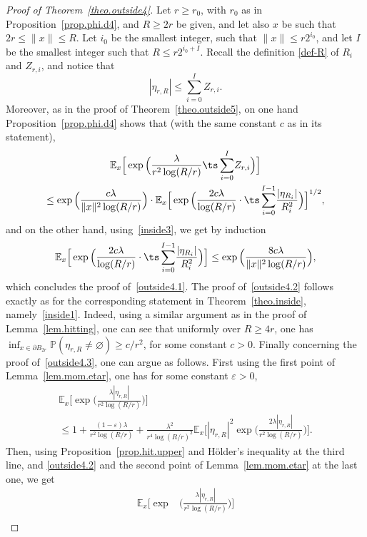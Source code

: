 \begin{proof}[Proof of Theorem~\ref{theo.outside4}]
Let $r\ge r_0$, with $r_0$ as in Proposition~\ref{prop.phi.d4}, and $R\ge 2r$ be given, and let also $x$ be such
that $2r\le \|x\|\le R$. Let $i_0$ be the smallest integer,
such that $\|x\|\le r2^{i_0}$,
and let $I$ be the smallest integer such that $R\le r2^{i_0+I}$.
Recall the definition \eqref{def-R} of $R_i$ and $Z_{r,i}$, and notice that
\[
|\eta_{r,R}| \le \sum_{i=0}^I Z_{r,i}.
\]
Moreover, as in the proof of Theorem~\ref{theo.outside5}, on one hand Proposition~\ref{prop.phi.d4} shows that (with the same constant $c$ as in its statement),
\begin{multline*}
\mathbb E_x\Big[\exp\Big(\frac{\lambda}{r^2\log(R/r)}
{\ts\sum_{i=0}^I} Z_{r,i}\Big)\Big]\\
\le\exp\Big(\frac{c\lambda}{\|x\|^2\log(R/r)}\Big)
\cdot \mathbb E_x\Big[ \exp\Big(\frac{2c\lambda}{\log(R/r)}
\cdot {\ts\sum_{i=0}^{I-1}} \frac{ |\eta_{R_i}|}{R_i^2}\Big)\Big]^{1/2},
\end{multline*}
and on the other hand, using~\eqref{inside3}, we get by induction
\[
\mathbb E_x\Big[ \exp\Big(\frac{2c\lambda}{\log(R/r)}\cdot {\ts\sum_{i=0}^{I-1}}
\frac{ |\eta_{R_i}|}{R_i^2}\Big)\Big]
\le \exp\Big(\frac{8c\lambda}{\|x\|^2 \log(R/r)}\Big),
\]
which concludes the proof of~\eqref{outside4.1}. The proof of~\eqref{outside4.2} follows exactly as for the corresponding statement
in Theorem~\ref{theo.inside}, namely~\eqref{inside1}. Indeed, using a similar argument as in the proof of Lemma~\ref{lem.hitting},
one can see that uniformly over $R\ge 4r$, one has $\inf_{x\in \partial B_{2r}} \mathbb P(\eta_{r,R}\neq \varnothing) \ge c/r^2$, for some constant $c>0$. Finally concerning the proof of~\eqref{outside4.3},
one can argue as follows. First using the first point of Lemma~\ref{lem.mom.etar}, one has for some constant $\varepsilon>0$,
\begin{multline*}
\mathbb E_x\Big[\exp\Big(\frac{\lambda|\eta_{r,R}|}{r^2\log(R/r)}\Big)\Big]\\
\le 1+\frac{(1-\varepsilon)\lambda}{r^2\log(R/r)} + \frac{\lambda^2}{r^4\log(R/r)^2}
\mathbb E_x\Big[|\eta_{r,R}|^2\exp\Big(\frac{2\lambda|\eta_{r,R}|}{r^2\log(R/r)}\Big)\Big].
\end{multline*}
Then, using Proposition~\ref{prop.hit.upper} and Hölder's inequality at the third line, and \eqref{outside4.2} and the second point of Lemma~\ref{lem.mom.etar} at the last one, we get
\begin{align*}
\mathbb E_x\Big[\exp&\Big(\frac{\lambda|\eta_{r,R}|}{r^2\log(R/r)}\Big)\Big]\\

\end{align*}
\end{proof}
